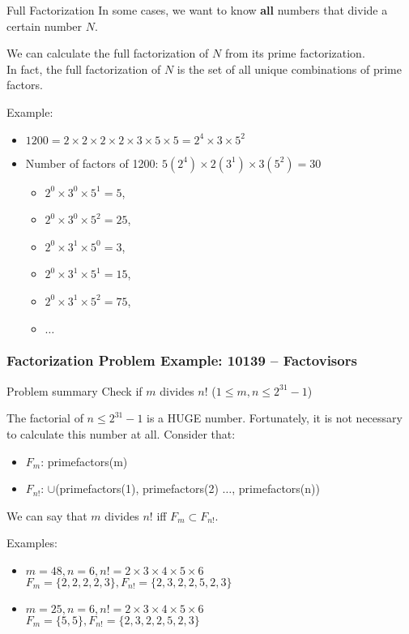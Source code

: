 \begin{frame}{Full Factorization}
  In some cases, we want to know {\bf all} numbers that divide a certain number $N$.\bigskip

  We can calculate the full factorization of $N$ from its prime factorization.\\
  In fact, the full factorization of $N$ is the set of all unique combinations of prime factors.\bigskip

  Example:
  \begin{itemize}
    \item $1200 = 2\times2\times2\times2\times3\times5\times5 = 2^4\times3\times5^2$
    \item Number of factors of 1200: $5(2^4)\times2(3^1)\times3(5^2) = 30$
    \begin{itemize}
      \item $2^0 \times 3^0 \times 5^1 = 5$,
      \item $2^0 \times 3^0 \times 5^2 = 25$,
      \item $2^0 \times 3^1 \times 5^0 = 3$,
      \item $2^0 \times 3^1 \times 5^1 = 15$,
      \item $2^0 \times 3^1 \times 5^2 = 75$,
      \item $\ldots$
    \end{itemize}
  \end{itemize}
\end{frame}

\begin{frame}
  \frametitle{Factorization Problem Example: 10139 -- Factovisors}

    \begin{block}{Problem summary}
      Check if $m$ divides $n!$ ($1 \leq m,n \leq 2^{31}-1$)
    \end{block}

    The factorial of $n \leq 2^{31}-1$ is a HUGE number. Fortunately, it is not necessary to calculate this number at all. Consider that:

    \begin{itemize}
    \item $F_m$: primefactors(m)
    \item $F_{n!}$: $\cup$(primefactors(1), primefactors(2) $\ldots$, primefactors(n))
    \end{itemize}

    We can say that $m$ divides $n!$ iff $F_m \subset F_{n!}$.\bigskip

    Examples:
    \begin{itemize}
    \item $m = 48, n=6, n! = 2\times3\times4\times5\times6$\\
      $F_m = \{2,2,2,2,3\}, F_{n!} = \{2,3,2,2,5,2,3\}$

  \medskip

    \item $m = 25, n=6, n! = 2\times3\times4\times5\times6$\\
      $F_m = \{5,5\}, F_{n!} = \{2,3,2,2,5,2,3\}$

    \end{itemize}
\end{frame}
